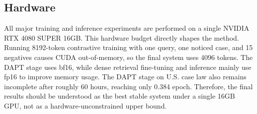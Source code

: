 \subsection{Hardware}

All major training and inference experiments are performed on a single NVIDIA RTX 4080 SUPER 16GB. This hardware budget directly shapes the method. Running 8192-token contrastive training with one query, one noticed case, and 15 negatives causes CUDA out-of-memory, so the final system uses 4096 tokens. The DAPT stage uses bf16, while dense retrieval fine-tuning and inference mainly use fp16 to improve memory usage. The DAPT stage on U.S. case law also remains incomplete after roughly 60 hours, reaching only 0.384 epoch. Therefore, the final results should be understood as the best stable system under a single 16GB GPU, not as a hardware-unconstrained upper bound.
